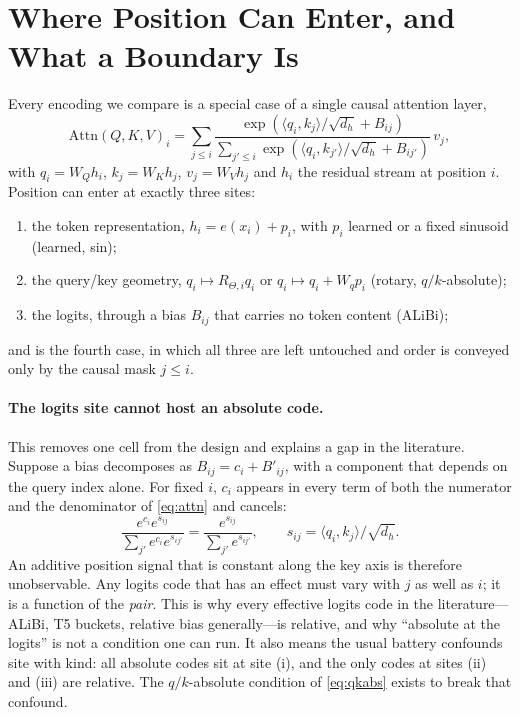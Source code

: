 \section{Where Position Can Enter, and What a Boundary Is}
\label{sec:method}

Every encoding we compare is a special case of a single causal attention layer,
\begin{equation}
\mathrm{Attn}(Q,K,V)_i
= \sum_{j\le i}
\frac{\exp\!\left(\langle q_i,k_j\rangle/\sqrt{d_h} + B_{ij}\right)}
{\sum_{j'\le i}\exp\!\left(\langle q_i,k_{j'}\rangle/\sqrt{d_h} + B_{ij'}\right)}\,
v_j ,
\label{eq:attn}
\end{equation}
with $q_i=W_Q h_i$, $k_j=W_K h_j$, $v_j=W_V h_j$ and $h_i$ the residual stream at
position $i$. Position can enter at exactly three sites:
\begin{enumerate}[leftmargin=1.4em,itemsep=0pt,topsep=1pt]
\item[(i)] the token representation, $h_i = e(x_i) + p_i$, with $p_i$ learned or a
  fixed sinusoid (learned, sin);
\item[(ii)] the query/key geometry, $q_i \mapsto R_{\Theta,i}q_i$ or
  $q_i \mapsto q_i + W_q p_i$ (rotary, $q/k$-absolute);
\item[(iii)] the logits, through a bias $B_{ij}$ that carries no token content
  (ALiBi);
\end{enumerate}
and \nope{} is the fourth case, in which all three are left untouched and order is
conveyed only by the causal mask $j\le i$.

\paragraph{The logits site cannot host an absolute code.} This removes one cell from
the design and explains a gap in the literature. Suppose a bias decomposes as
$B_{ij} = c_i + B'_{ij}$, with a component that depends on the query index alone.
For fixed $i$, $c_i$ appears in every term of both the numerator and the denominator
of \eqref{eq:attn} and cancels:
\begin{equation}
\frac{e^{c_i}e^{s_{ij}}}{\sum_{j'} e^{c_i}e^{s_{ij'}}}
= \frac{e^{s_{ij}}}{\sum_{j'} e^{s_{ij'}}}, \qquad s_{ij}=\langle q_i,k_j\rangle/\sqrt{d_h}.
\label{eq:shift}
\end{equation}
An additive position signal that is constant along the key axis is therefore
unobservable. Any logits code that has an effect must vary with $j$ as well as $i$;
it is a function of the \emph{pair}. This is why every effective logits code in the
literature---ALiBi, T5 buckets, relative bias generally---is relative, and why
``absolute at the logits'' is not a condition one can run. It also means the usual
battery confounds site with kind: all absolute codes sit at site (i), and the only
codes at sites (ii) and (iii) are relative. The $q/k$-absolute condition of
\eqref{eq:qkabs} exists to break that confound.

